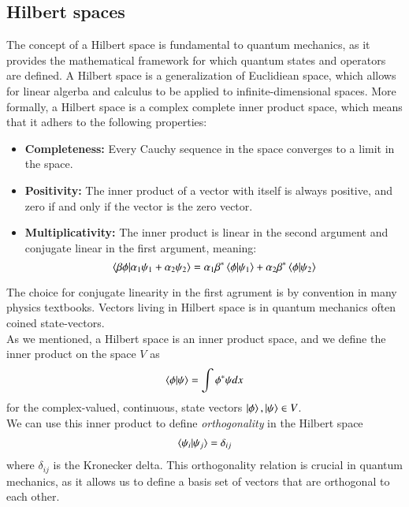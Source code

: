 \documentclass{subfiles}
\begin{document}
\subsection*{Hilbert spaces}
The concept of a Hilbert space is fundamental to quantum mechanics, as it provides the mathematical framework for which quantum states and operators are defined. A Hilbert space is a generalization of Euclidiean space, which allows for linear algerba and calculus to be applied to infinite-dimensional spaces. More formally, a Hilbert space is a complex complete inner product space, which means that it adhers to the following properties:
\begin{itemize}
    \item \textbf{Completeness:} Every Cauchy sequence in the space converges to a limit in the space.
    \item \textbf{Positivity:} The inner product of a vector with itself is always positive, and zero if and only if the vector is the zero vector.
    \item \textbf{Multiplicativity:} The inner product is linear in the second argument and conjugate linear in the first argument, meaning:
    \begin{equation}
        \braket{\beta\phi|\alpha_1\psi_1 + \alpha_2\psi_2} = \alpha_1\beta^*\braket{\phi|\psi_1} + \alpha_2\beta^*\braket{\phi|\psi_2} 
    \end{equation}
\end{itemize}
The choice for conjugate linearity in the first agrument is by convention in many physics textbooks. Vectors living in Hilbert space is in quantum mechanics often coined state-vectors. \\ As we mentioned, a Hilbert space is an inner product space, and we define the inner product on the space $V$ as
\begin{align*}
    \braket{\phi|\psi} = \int \phi^* \psi dx
\end{align*}
for the complex-valued, continuous, state vectors $\ket{\phi}, \ket{\psi} \in V$. \\ We can use this inner product to define \emph{orthogonality} in the Hilbert space
\begin{align*}
    \braket{\psi_i|\psi_j} = \delta_{ij}
\end{align*}
where $\delta_{ij}$ is the Kronecker delta. This orthogonality relation is crucial in quantum mechanics, as it allows us to define a basis set of vectors that are orthogonal to each other.
\end{document}
